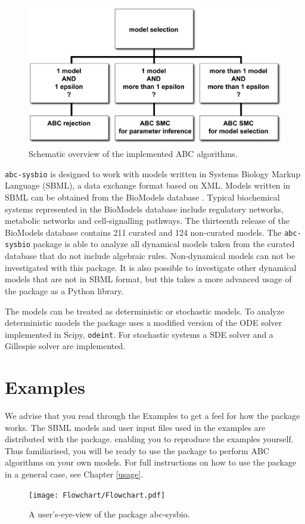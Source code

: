 \documentclass[a4paper]{report}
\begin{document}
\begin{figure}
\begin{center}
\includegraphics[width=1.0\textwidth]{Graphics/abcAlgorithms.png}
\caption{
{\bf } Schematic overview of the implemented ABC algorithms.
}
\label{abcAlgorithms}
\end{center}
\end{figure}

\verb$abc-sysbio$ is designed to work with models written in Systems Biology Markup Language (SBML), a data exchange format based on XML. Models written in SBML can be obtained from the BioModels database \citep{LeNovere2006}. Typical biochemical systems represented in the BioModels database include regulatory networks, metabolic networks and cell-signalling pathways. The thirteenth release of the BioModels database contains 211 curated and 124 non-curated models. The \verb$abc-sysbio$ package is able to analyze all dynamical models taken from the curated database that do not include algebraic rules. Non-dynamical models can not be investigated with this package. It is also possible to investigate other dynamical models that are not in SBML format, but this takes a more advanced usage of the package as a Python library.

The models can be treated as deterministic or stochastic models. To analyze deterministic models the package uses a modified version of the ODE solver implemented in Scipy, \verb$odeint$. For stochastic systems a SDE solver and a Gillespie solver are implemented.
\chapter{Examples}
\label{examples}
We advise that you read through the Examples to get a feel for how the package works. The SBML models and user input files used in the examples are distributed with the package. enabling you to reproduce the examples yourself. Thus familiarised, you will be ready to use the package to perform ABC  algorithms on your own models. For full instructions on how to use the package in a general case, see Chapter \ref{usage}.
\begin{figure}[p]
\begin{center}
\texttt{[image: Flowchart/Flowchart.pdf]}
\caption{A user's-eye-view of the package abc-sysbio. \label{Flowchart}}
\end{center}
\end{figure}
\end{document}
